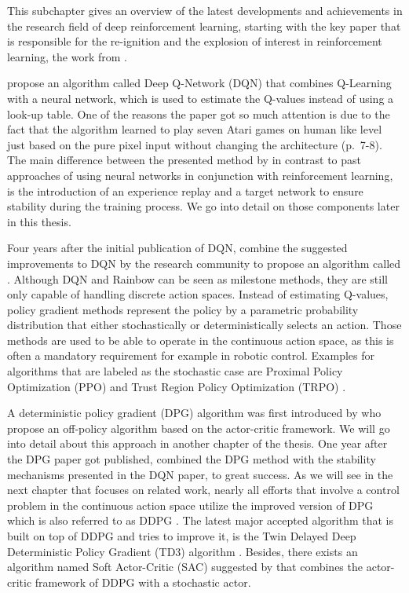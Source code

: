 This subchapter gives an overview of the latest developments and achievements in the research field of deep reinforcement learning, starting with the key paper that is responsible for the re-ignition and the explosion of interest in reinforcement learning, the work from \cite{mnih2013playing, mnih2015human}.
\par 
\cite{mnih2013playing} propose an algorithm called Deep Q-Network
(DQN) that combines Q-Learning with a neural network, which is used to estimate the Q-values instead of using a look-up table. One of the reasons the paper got so much attention is due to the fact that the algorithm learned to play seven Atari games on human like level just based on the pure pixel input without changing the architecture (p.~7-8). The main difference between the presented method by \cite{mnih2013playing} in contrast to past approaches of using neural networks in conjunction with reinforcement learning, is the introduction of an experience replay and a target network to ensure stability during the training process. We go into detail on those components later in this thesis.
\par
Four years after the initial publication of DQN, \cite{hessel2018rainbow} combine the suggested improvements to DQN by the research community to propose an algorithm called . Although DQN and Rainbow can be seen as milestone methods, they are still only capable of handling discrete action spaces. Instead of estimating Q-values, policy gradient methods represent the policy by a parametric probability distribution that either stochastically or deterministically selects an action. Those methods are used to be able to operate in the continuous action space, as this is often a mandatory requirement for example in robotic control. Examples for algorithms that are labeled as the stochastic case are Proximal Policy Optimization (PPO) \cite[]{schulman2017proximal} and Trust Region Policy Optimization (TRPO) \cite[]{schulman2017trust}.
\par 
A deterministic policy gradient (DPG) algorithm was first introduced by \cite{silver2014deterministic} who propose an off-policy algorithm based on the actor-critic framework. We will go into detail about this approach in another chapter of the thesis. One year after the DPG paper got published, \cite{lillicrap2019continuous} combined the DPG method with the stability mechanisms presented in the DQN paper, to great success. As we will see in the next chapter that focuses on related work, nearly all efforts that involve  a control problem in the continuous action space utilize the improved version of DPG which is also referred to as DDPG \cite[p.~2]{lillicrap2019continuous}. The latest major accepted algorithm that is built on top of DDPG and tries to improve it, is the Twin Delayed Deep Deterministic Policy Gradient (TD3) algorithm \cite[]{fujimoto2018addressing}. Besides, there exists an algorithm named Soft Actor-Critic (SAC) suggested by \cite{haarnoja2018soft} that combines the actor-critic framework of DDPG with a stochastic actor.
